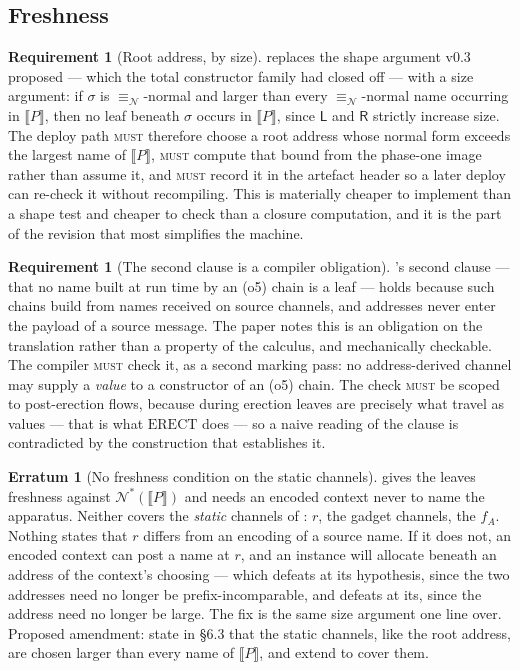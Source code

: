 \documentclass[11pt,a4paper]{article}
\newcommand{\MUST}{\textsc{must}}
\newcommand{\enc}[1]{\llbracket #1 \rrbracket}
\newcommand{\nequiv}{\equiv_{\mathcal{N}}}
\newcommand{\nms}[1]{\mathcal{N}^{*}(#1)}
\newcommand{\Lft}{\mathsf{L}}
\newcommand{\Rgt}{\mathsf{R}}
\newcommand{\ERECT}{\mathrm{ERECT}}
\theoremstyle{definition}
\newtheorem{requirement}[definition]{Requirement}
\newtheorem{erratum}[definition]{Erratum}
\theoremstyle{plain}
\begin{document}
\subsection{Freshness}\label{sec:fresh}

\begin{requirement}[Root address, by size]\label{req:rootaddr}
\cite[Lem.~6.14]{draft3} replaces the shape argument v0.3 proposed --- which
the total constructor family had closed off --- with a size argument: if
$\sigma$ is $\nequiv$-normal and larger than every $\nequiv$-normal name
occurring in $\enc{P}$, then no leaf beneath $\sigma$ occurs in $\enc{P}$,
since $\Lft$ and $\Rgt$ strictly increase size. The deploy path \MUST{}
therefore choose a root address whose normal form exceeds the largest name of
$\enc{P}$, \MUST{} compute that bound from the phase-one image rather than
assume it, and \MUST{} record it in the artefact header so a later deploy can
re-check it without recompiling. This is materially cheaper to implement than
a shape test and cheaper to check than a closure computation, and it is the
part of the revision that most simplifies the machine.
\end{requirement}

\begin{requirement}[The second clause is a compiler obligation]
\label{req:o5noaddr}
\cite[Lem.~6.14]{draft3}'s second clause --- that no name built at run time by
an (o5) chain is a leaf --- holds because such chains build from names
received on source channels, and addresses never enter the payload of a source
message. The paper notes this is an obligation on the translation rather than
a property of the calculus, and mechanically checkable. The compiler \MUST{}
check it, as a second marking pass: no address-derived channel may supply a
\emph{value} to a constructor of an (o5) chain. The check \MUST{} be scoped to
post-erection flows, because during erection leaves are precisely what travel
as values --- that is what $\ERECT$ does --- so a naive reading of the clause
is contradicted by the construction that establishes it.
\end{requirement}

\begin{erratum}[No freshness condition on the static channels]
\label{err:staticfresh}
\cite[Lem.~6.14]{draft3} gives the leaves freshness against $\nms{\enc{P}}$
and \cite[Lem.~7.6]{draft3} needs an encoded context never to name the
apparatus. Neither covers the \emph{static} channels of
\cite[Def.~6.8]{draft3}: $r$, the gadget channels, the $f_{A}$. Nothing states
that $r$ differs from an encoding of a source name. If it does not, an encoded
context can post a name at $r$, and an instance will allocate beneath an
address of the context's choosing --- which defeats
\cite[Lem.~6.11]{draft3} at its hypothesis, since the two addresses need no
longer be prefix-incomparable, and defeats \cite[Lem.~6.14]{draft3} at its,
since the address need no longer be large. The fix is the same size argument
one line over. Proposed amendment: state in \S6.3 that the static channels,
like the root address, are chosen larger than every name of $\enc{P}$, and
extend \cite[Lem.~7.6]{draft3} to cover them.
\end{erratum}
\end{document}
